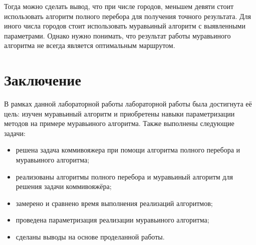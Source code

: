 \documentclass[12pt]{report}
\begin{document}
Тогда можно сделать вывод, что при числе городов, меньшем девяти стоит использовать алгоритм полного перебора для получения точного результата. Для иного числа городов стоит использовать муравьиный алгоритм с выявленными параметрами. Однако нужно понимать, что результат работы муравьиного алгоритма не всегда является оптимальным маршрутом.

\chapter*{Заключение}
	
В рамках данной лабораторной работы лабораторной работы была достигнута её цель: изучен муравьиный алгоритм и приобретены навыки параметризации методов на примере муравьиного алгоритма. Также выполнены следующие задачи:
	
\begin{itemize}
	\item решена задача коммивояжера при помощи алгоритма полного перебора и муравьиного алгоритма;
	\item реализованы алгоритмы полного перебора и муравьиный алгоритм для решения задачи коммивояжёра;
	\item замерено и сравнено время выполнения реализаций алгоритмов;
	\item проведена параметризация реализации муравьиного алгоритма;
	\item сделаны выводы на основе проделанной работы.
\end{itemize} 

	
\end{document}
